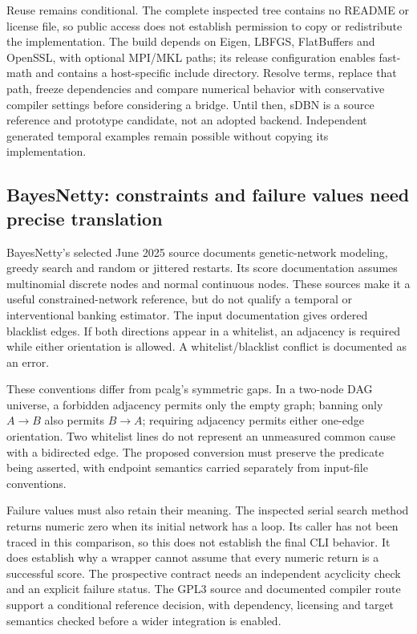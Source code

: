 Reuse remains conditional. The complete inspected tree contains no README
or license file, so public access does not establish permission to copy or
redistribute the implementation. The build depends on Eigen, LBFGS,
FlatBuffers and OpenSSL, with optional MPI/MKL paths; its release configuration
enables fast-math and contains a host-specific include directory. Resolve
terms, replace that path, freeze dependencies and compare numerical behavior
with conservative compiler settings before considering a bridge. Until then,
sDBN is a source reference and prototype candidate, not an adopted backend.
Independent generated temporal examples remain possible without copying its
implementation. \citep{exec16_ct_sdbn}

\subsection{BayesNetty: constraints and failure values need precise translation}

BayesNetty's selected June 2025 source documents genetic-network modeling,
greedy search and random or jittered restarts. Its score documentation assumes
multinomial discrete nodes and normal continuous nodes. These sources make it
a useful constrained-network reference, but do not qualify a temporal or
interventional banking estimator. The input documentation gives ordered
blacklist edges. If both directions appear in a whitelist, an adjacency is
required while either orientation is allowed. A whitelist/blacklist conflict
is documented as an error. \citep{exec16_ct_bayesnetty}

These conventions differ from pcalg's symmetric gaps. In a two-node DAG
universe, a forbidden adjacency permits only the empty graph; banning only
$A\to B$ also permits $B\to A$; requiring adjacency permits either one-edge
orientation. Two whitelist lines do not represent an unmeasured common cause
with a bidirected edge. The proposed conversion must preserve the predicate
being asserted, with endpoint semantics carried separately from input-file
conventions. \citep{exec16_ct_bayesnetty,exec16_ct_pcalg,exec16_ct_oracle}

Failure values must also retain their meaning. The inspected serial search
method returns numeric zero when its initial network has a loop. Its caller
has not been traced in this comparison, so this does not establish the final
CLI behavior. It does establish why a wrapper cannot assume that every numeric
return is a successful score. The prospective contract needs an independent
acyclicity check and an explicit failure status. The GPL3 source and documented
compiler route support a conditional reference decision, with dependency,
licensing and target semantics checked before a wider integration is enabled.
\citep{exec16_ct_bayesnetty,exec16_ct_design}

